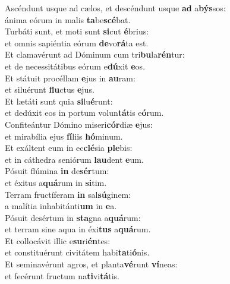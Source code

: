\evenverse Ascéndunt usque ad cælos, et descéndunt usque \textbf{ad} a\textbf{býs}sos:~\*\\
\evenverse ánima eórum in malis \textbf{ta}be\textbf{scé}bat.\\
\oddverse Turbáti sunt, et moti sunt \textbf{si}cut \textbf{é}brius:~\*\\
\oddverse et omnis sapiéntia eórum \textbf{de}vo\textbf{rá}ta est.\\
\evenverse Et clamavérunt ad Dóminum cum tri\textbf{bu}la\textbf{rén}tur:~\*\\
\evenverse et de necessitátibus eórum e\textbf{dú}xit \textbf{e}os.\\
\oddverse Et státuit procéllam \textbf{e}jus in \textbf{au}ram:~\*\\
\oddverse et siluérunt \textbf{flu}ctus \textbf{e}jus.\\
\evenverse Et lætáti sunt quia \textbf{si}lu\textbf{é}runt:~\*\\
\evenverse et dedúxit eos in portum volun\textbf{tá}tis e\textbf{ó}rum.\\
\oddverse Confiteántur Dómino miseri\textbf{cór}diæ \textbf{e}jus:~\*\\
\oddverse et mirabília ejus \textbf{fí}liis \textbf{hó}minum.\\
\evenverse Et exáltent eum in ec\textbf{clé}sia \textbf{ple}bis:~\*\\
\evenverse et in cáthedra seniórum \textbf{lau}dent \textbf{e}um.\\
\oddverse Pósuit flúmina \textbf{in} de\textbf{sér}tum:~\*\\
\oddverse et éxitus a\textbf{quá}rum in \textbf{si}tim.\\
\evenverse Terram fructíferam \textbf{in} sal\textbf{sú}ginem:~\*\\
\evenverse a malítia inhabitánti\textbf{um} in \textbf{e}a.\\
\oddverse Pósuit desértum in \textbf{sta}gna a\textbf{quá}rum:~\*\\
\oddverse et terram sine aqua in éxi\textbf{tus} a\textbf{quá}rum.\\
\evenverse Et collocávit illic e\textbf{su}ri\textbf{én}tes:~\*\\
\evenverse et constituérunt civitátem habi\textbf{ta}ti\textbf{ó}nis.\\
\oddverse Et seminavérunt agros, et planta\textbf{vé}runt \textbf{ví}neas:~\*\\
\oddverse et fecérunt fructum na\textbf{ti}vi\textbf{tá}tis.\\
